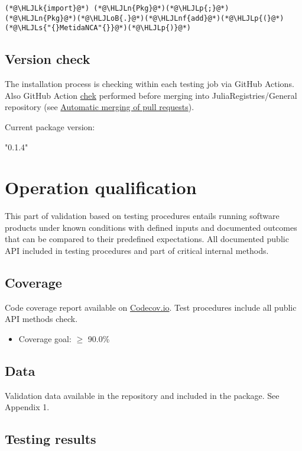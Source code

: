 \documentclass[12pt,a4paper]{article}
\newcommand{\HLJLk}[1]{\textcolor[RGB]{148,91,176}{\textbf{#1}}}
\newcommand{\HLJLn}[1]{#1}
\newcommand{\HLJLnf}[1]{\textcolor[RGB]{66,102,213}{#1}}
\newcommand{\HLJLs}[1]{\textcolor[RGB]{201,61,57}{#1}}
\newcommand{\HLJLoB}[1]{\textcolor[RGB]{102,102,102}{\textbf{#1}}}
\newcommand{\HLJLp}[1]{#1}
\begin{document}
\begin{lstlisting}
(*@\HLJLk{import}@*) (*@\HLJLn{Pkg}@*)(*@\HLJLp{;}@*) (*@\HLJLn{Pkg}@*)(*@\HLJLoB{.}@*)(*@\HLJLnf{add}@*)(*@\HLJLp{(}@*)(*@\HLJLs{"{}MetidaNCA"{}}@*)(*@\HLJLp{)}@*)
\end{lstlisting}

\subsection{Version check}
The installation process is checking within each testing job via GitHub Actions. Also GitHub Action \href{https://github.com/JuliaRegistries/General/blob/master/.github/workflows/automerge.yml}{chek} performed before merging into JuliaRegistries/General repository (see \href{https://github.com/JuliaRegistries/General#automatic-merging-of-pull-requests}{Automatic merging of pull requests}).



Current package version:


"0.1.4"


\section{Operation qualification}
This part of validation based on testing procedures entails running software products under known conditions with defined inputs and documented outcomes that can be compared to their predefined expectations. All documented public API included in testing procedures and part of critical internal methods.

\subsection{Coverage}
Code coverage report available on \href{https://app.codecov.io/gh/PharmCat/MetidaNCA.jl}{Codecov.io}. Test procedures include all  public API methods check.

\begin{itemize}
\item Coverage goal: \ensuremath{\geq} 90.0\%

\end{itemize}
\subsection{Data}
Validation data available in the repository and included in the package. See Appendix 1.

\subsection{Testing results}
\end{document}
